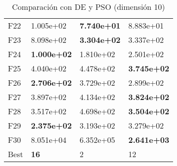 \documentclass[10pt,a4paper]{article}
\begin{document}
\begin{table}[h]
\begin{tabular}{|l|l|l|l|}
		F22  & 1.005e+02          & \textbf{7.740e+01} & 8.883e+01          \\
		F23  & 8.098e+02          & \textbf{3.304e+02} & 3.337e+02          \\
		F24  & \textbf{1.000e+02} & 1.810e+02          & 2.501e+02          \\
		F25  & 4.040e+02          & 4.478e+02          & \textbf{3.745e+02} \\
		F26  & \textbf{2.706e+02} & 3.729e+02          & 2.899e+02          \\
		F27  & 3.897e+02          & 4.134e+02          & \textbf{3.824e+02} \\
		F28  & 3.517e+02          & 4.698e+02          & \textbf{3.504e+02} \\
		F29  & \textbf{2.375e+02} & 3.193e+02          & 3.279e+02          \\
		F30  & 8.051e+04          & 6.352e+05          & \textbf{2.641e+03} \\ \hline
		Best & \textbf{16}        & 2                  & 12                 \\ \hline
	\end{tabular}
	\caption{Comparación con DE y PSO (dimensión 10)}
	\label{table:mimh2_dim10}
\end{table}
\end{document}
